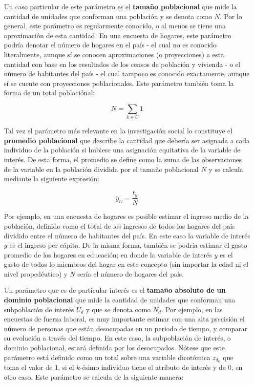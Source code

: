 \documentclass[
  10pt,
  spanish,
]{book}
\begin{document}
Un caso particular de este parámetro es el \textbf{tamaño poblacional} que mide la cantidad de unidades que conforman una población y se denota como \(N\). Por lo general, este parámetro es regularmente conocido, o al menos se tiene una aproximación de esta cantidad. En una encuesta de hogares, este parámetro podría denotar el número de hogares en el país - el cual no es conocido literalmente, aunque sí se conocen aproximaciones (o proyecciones) a esta cantidad con base en los resultados de los censos de población y vivienda - o el número de habitantes del país - el cual tampoco es conocido exactamente, aunque sí se cuente con proyecciones poblacionales. Este parámetro también toma la forma de un total poblaciónal:

\[N = \sum_{k \in U}1\]

Tal vez el parámetro más relevante en la investigación social lo constituye el \textbf{promedio poblacional} que describe la cantidad que debería ser asignada a cada individuo de la población si hubiese una asignación equitativa de la variable de interés. De esta forma, el promedio se define como la suma de las observaciones de la variable en la población dividida por el tamaño poblacional \(N\) y se calcula mediante la siguiente expresión:

\[\bar{y}_U = \frac{t_y}{N}\]

Por ejemplo, en una encuesta de hogares es posible estimar el ingreso medio de la población, definido como el total de los ingresos de todos los hogares del país dividido entre el número de habitantes del país. En este caso la variable de interés \(y\) es el ingreso per cápita. De la misma forma, también se podría estimar el gasto promedio de los hogares en educación; en donde la variable de interés \(y\) es el gasto de todos lo miembros del hogar en este concepto (sin importar la edad ni el nivel propedéutico) y \(N\) sería el número de hogares del país.

Un parámetro que es de particular interés es el \textbf{tamaño absoluto de un dominio poblacional} que mide la cantidad de unidades que conforman una subpoblación de interés \(U_d\) y que se denota como \(N_d\). Por ejemplo, en las encuestas de fuerza laboral, es muy importante estimar con una alta precisión el número de personas que están desocupadas en un periodo de tiempo, y comparar su evolución a través del tiempo. En este caso, la subpoblación de interés, o dominio poblacional, estará definida por los desocupados. Nótese que este parámetro está definido como un total sobre una variable dicotómica \(z_{d_k}\) que toma el valor de 1, si el \(k\)-ésimo individuo tiene el atributo de interés y de 0, en otro caso. Este parámetro se calcula de la siguiente manera:
\end{document}
